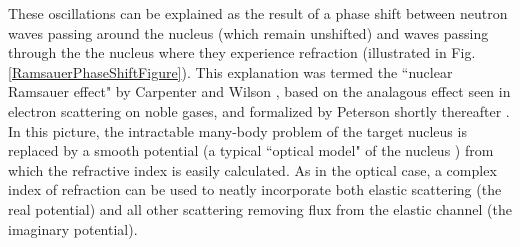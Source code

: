 \documentclass[twocolumn,secnumarabic,amssymb, nobibnotes, aps, prl,
superscriptaddress, nobalancelastpage]{revtex4}
\begin{document}
These oscillations can be explained as the result of a phase shift between 
neutron waves passing around the nucleus (which remain unshifted) and waves passing
through the the nucleus where they experience refraction
(illustrated in Fig. \ref{RamsauerPhaseShiftFigure}). This explanation was termed the 
``nuclear Ramsauer effect" by Carpenter and Wilson \cite{Carpenter1959}, based on the
analagous effect seen in electron scattering on noble gases, and formalized by
Peterson shortly thereafter \cite{Peterson1962}.
In this picture, the intractable many-body
problem of the target nucleus is replaced by a smooth potential (a typical 
``optical model" of the nucleus \cite{Feshbach1958}) from which the refractive
index is easily calculated. As in the optical case, a complex index of
refraction can be used to neatly incorporate both elastic scattering (the real
potential) and all other scattering removing flux from the elastic channel (the imaginary potential).
\end{document}
